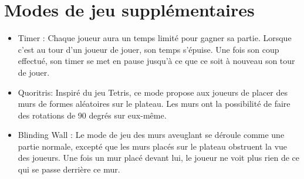 \section{Modes de jeu supplémentaires}
\begin{itemize}
    \item Timer : Chaque joueur aura un temps limité pour gagner sa partie. Lorsque c'est au tour d'un joueur de jouer, son temps s'épuise. Une fois son coup effectué, son timer se met en pause jusqu'à ce que ce soit à nouveau son tour de jouer. 
    \item Quoritris: Inspiré du jeu Tetris, ce mode propose aux joueurs de placer des murs de formes aléatoires sur le plateau. Les murs ont la possibilité de faire des rotations de 90 degrés sur eux-même.    
    \item Blinding Wall : Le mode de jeu des murs aveuglant se déroule comme une partie normale, excepté que les murs placés sur le plateau obstruent la vue des joueurs. Une fois un mur placé devant lui, le joueur ne voit plus rien de ce qui se passe derrière ce mur.
\end{itemize}
